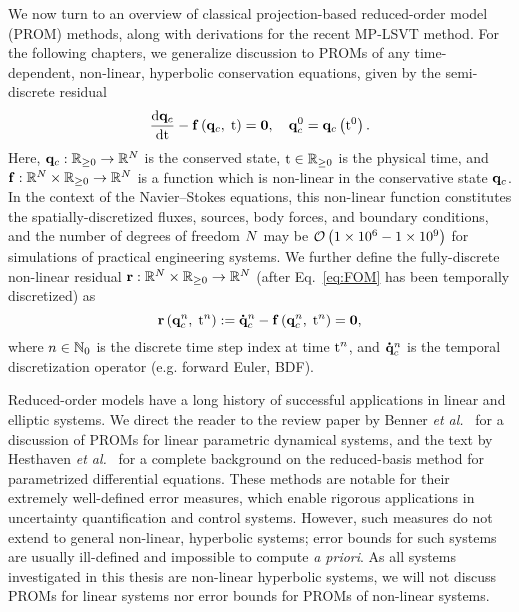 We now turn to an overview of classical projection-based reduced-order model (PROM) methods, along with derivations for the recent MP-LSVT method. For the following chapters, we generalize discussion to PROMs of any time-dependent, non-linear, hyperbolic conservation equations, given by the semi-discrete residual
%
\begin{equation}\label{eq:FOM}
    \frac{\text{d} \mathbf{q}_{c}}{\text{d} \text{t}} - \mathbf{f} \left(\mathbf{q}_{c}, \; \text{t}\right) = \mathbf{0}, \quad \mathbf{q}_{c}^0 = \mathbf{q}_{c} \left(\text{t}^0\right).
\end{equation}
%
Here, $\mathbf{q}_{c}: \mathbb{R}_{\ge 0} \rightarrow \mathbb{R}^{N}$ is the conserved state, $\text{t} \in \mathbb{R}_{\ge 0}$ is the physical time, and $\mathbf{f}: \mathbb{R}^{N} \times \mathbb{R}_{\ge 0} \rightarrow \mathbb{R}^{N}$ is a function which is non-linear in the conservative state $\mathbf{q}_{c}$. In the context of the Navier--Stokes equations, this non-linear function constitutes the spatially-discretized fluxes, sources, body forces, and boundary conditions, and the number of degrees of freedom $N$ may be $\mathcal{O}\left(1 \times 10^6 - 1 \times 10^9\right)$ for simulations of practical engineering systems. We further define the fully-discrete non-linear residual $\mathbf{r}: \mathbb{R}^{N} \times \mathbb{R}_{\ge 0} \rightarrow \mathbb{R}^{N}$ (after Eq.~\ref{eq:FOM} has been temporally discretized) as
%
\begin{equation}
    \mathbf{r}\left(\mathbf{q}_{c}^{n}, \; \text{t}^{n}\right) := \accentset{\mbox{\large\bfseries .}}{\mathbf{q}}_{c}^{n} - \mathbf{f} \left(\mathbf{q}_{c}^{n}, \; \text{t}^{n}\right) = \mathbf{0},
\end{equation}
%
where $n \in \mathbb{N}_0$ is the discrete time step index at time $\text{t}^{n}$, and $\accentset{\mbox{\large\bfseries .}}{\mathbf{q}}_{c}^{n}$ is the temporal discretization operator (e.g. forward Euler, BDF).

Reduced-order models have a long history of successful applications in linear and elliptic systems. We direct the reader to the review paper by Benner \textit{et al.}~\cite{Benner2015} for a discussion of PROMs for linear parametric dynamical systems, and the text by Hesthaven \textit{et al.}~\cite{certRedBasisBook} for a complete background on the reduced-basis method for parametrized differential equations. These methods are notable for their extremely well-defined error measures, which enable rigorous applications in uncertainty quantification and control systems. However, such measures do not extend to general non-linear, hyperbolic systems; error bounds for such systems are usually ill-defined and impossible to compute \textit{a priori}. As all systems investigated in this thesis are non-linear hyperbolic systems, we will not discuss PROMs for linear systems nor error bounds for PROMs of non-linear systems.
